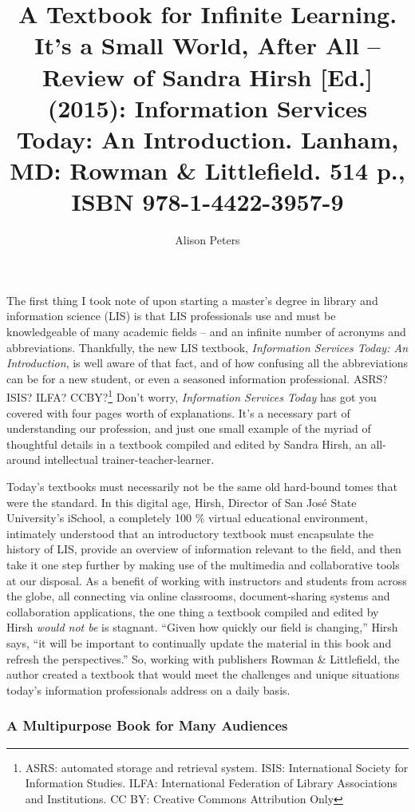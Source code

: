 \documentclass[a4paper,
fontsize=11pt,
oneside,
numbers=noperiodatend,
parskip=half-,
bibliography=totoc,
final
]{scrartcl}
\title{\LARGE{A Textbook for Infinite Learning. It’s a Small World, After All – Review of Sandra Hirsh [Ed.] (2015): Information Services Today: An Introduction. Lanham, MD: Rowman \& Littlefield. 514 p., ISBN 978-1-4422-3957-9}} %
\author{Alison Peters} %
\date{}
\begin{document}
\maketitle
\thispagestyle{fancyplain} 


The first thing I took note of upon starting a master's degree in
library and information science (LIS) is that LIS professionals use and
must be knowledgeable of many academic fields -- and an infinite number
of acronyms and abbreviations. Thankfully, the new LIS textbook,
\emph{Information Services Today: An Introduction}, is well aware of
that fact, and of how confusing all the abbreviations can be for a new
student, or even a seasoned information professional. ASRS? ISIS? ILFA?
CCBY?\footnote{ASRS: automated storage and retrieval system. ISIS:
  International Society for Information Studies. ILFA: International
  Federation of Library Associations and Institutions. CC BY: Creative
  Commons Attribution Only} Don't worry, \emph{Information Services
Today} has got you covered with four pages worth of explanations. It's a
necessary part of understanding our profession, and just one small
example of the myriad of thoughtful details in a textbook compiled and
edited by Sandra Hirsh, an all-around intellectual
trainer-teacher-learner.

Today's textbooks must necessarily not be the same old hard-bound tomes
that were the standard. In this digital age, Hirsh, Director of San José
State University's iSchool, a completely 100 \% virtual educational
environment, intimately understood that an introductory textbook must
encapsulate the history of LIS, provide an overview of information
relevant to the field, and then take it one step further by making use
of the multimedia and collaborative tools at our disposal. As a benefit
of working with instructors and students from across the globe, all
connecting via online classrooms, document-sharing systems and
collaboration applications, the one thing a textbook compiled and edited
by Hirsh \emph{would not be} is stagnant. \enquote{Given how quickly our
field is changing,} Hirsh says, \enquote{it will be important to
continually update the material in this book and refresh the
perspectives.} So, working with publishers Rowman \& Littlefield, the
author created a textbook that would meet the challenges and unique
situations today's information professionals address on a daily basis.

\subsubsection{A Multipurpose Book for Many
Audiences}\label{a-multipurpose-book-for-many-audiences}
\end{document}
